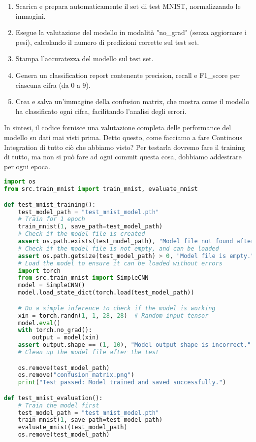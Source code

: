 \documentclass[a4paper,12pt]{article}
\begin{document}
\begin{enumerate}
    \item Scarica e prepara automaticamente il set di test MNIST, normalizzando le immagini.
    \item Esegue la valutazione del modello in modalità "no\_grad" (senza aggiornare i pesi), calcolando il numero di predizioni corrette sul test set.
    \item Stampa l'accuratezza del modello sul test set.
    \item Genera un classification report contenente precision, recall e F1\_score per ciascuna cifra (da 0 a 9).
    \item Crea e salva un'immagine della confusion matrix, che mostra come il modello ha classificato ogni cifra, facilitando l'analisi degli errori.
\end{enumerate}
In sintesi, il codice fornisce una valutazione completa delle performance del modello su dati mai visti prima.
\newline
\newline 
Detto questo, come facciamo a fare Continous Integration di tutto ciò che abbiamo visto? 
Per testarla dovremo fare il training di tutto, ma non si può fare ad ogni commit questa cosa, dobbiamo addestrare per ogni epoca.
\begin{lstlisting}[language=Python, basicstyle=\ttfamily\footnotesize, breaklines=true, frame=single]
    import os
from src.train_mnist import train_mnist, evaluate_mnist

def test_mnist_training():
    test_model_path = "test_mnist_model.pth"
    # Train for 1 epoch
    train_mnist(1, save_path=test_model_path)
    # Check if the model file is created
    assert os.path.exists(test_model_path), "Model file not found after training."
    # Check if the model file is not empty, and can be loaded
    assert os.path.getsize(test_model_path) > 0, "Model file is empty."
    # Load the model to ensure it can be loaded without errors
    import torch
    from src.train_mnist import SimpleCNN
    model = SimpleCNN()
    model.load_state_dict(torch.load(test_model_path))

    # Do a simple inference to check if the model is working
    xin = torch.randn(1, 1, 28, 28)  # Random input tensor
    model.eval()
    with torch.no_grad():
        output = model(xin)
    assert output.shape == (1, 10), "Model output shape is incorrect."
    # Clean up the model file after the test

    os.remove(test_model_path)
    os.remove("confusion_matrix.png")
    print("Test passed: Model trained and saved successfully.")

def test_mnist_evaluation():
    # Train the model first
    test_model_path = "test_mnist_model.pth"
    train_mnist(1, save_path=test_model_path)
    evaluate_mnist(test_model_path)
    os.remove(test_model_path)
\end{lstlisting}
\end{document}
